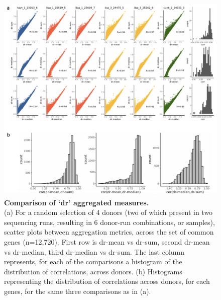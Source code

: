 \begin{figure}[h]
    \centering
    \includegraphics[width=15cm]{Appendix2/Fig/supp_aggregated_figures_dr.png}
    \caption[Comparison of `dr' aggregated measures]{\textbf{Comparison of `dr' aggregated measures.}\\
    (a) For a random selection of 4 donors (two of which present in two sequencing runs, resulting in 6 donor-run combinations, or samples), scatter plots between aggregation metrics, across the set of common genes (n=12,720).
    First row is dr-mean vs dr-sum, second dr-mean vs dr-median, third dr-median vs dr-sum.
    The last column represents, for each of the comparisons a histogram of the distribution of correlations, across donors.
    (b) Histograms representing the distribution of correlations across donors, for each genes, for the same three comparisons as in (a).}
    \label{suppl_fig:aggregation_comparison_dr}
\end{figure}

